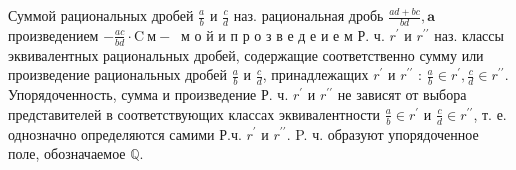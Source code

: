\documentclass[10pt]{article}
\begin{document}
Суммой рациональных дробей $\frac{a}{b}$ и $\frac{c}{d}$ наз. рациональная дробь $\frac{a d+b c}{b d}, \mathbf{a}$ произведением $-\frac{a c}{b d} \cdot \mathrm{C} \mathbf{~ м - ~}$ м о й и п р о з в е д е и е м Р. ч. $r^{\prime}$ и $r^{\prime \prime}$ наз. классы эквивалентных рациональных дробей, содержащие соответственно сумму или произведение рациональных дробей $\frac{a}{b}$ и $\frac{c}{d}$, принадлежащих $r^{\prime}$ и $r^{\prime \prime}$ : $\frac{a}{b} \in r^{\prime}, \frac{c}{d} \in r^{\prime \prime}$. Упорядоченность, сумма и произведение Р. ч. $r{ }^{\prime}$ и $r^{\prime \prime}$ не зависят от выбора представителей в соответствующих классах эквивалентности $\frac{a}{b} \in r^{\prime}$ и $\frac{c}{d} \in r^{\prime \prime}$, т. е. однозначно определяются самими Р.ч. $r^{\prime}$ и $r^{\prime \prime}$. P. ч. образуют упорядоченное поле, обозначаемое $\mathbb{Q}$.
\end{document}
